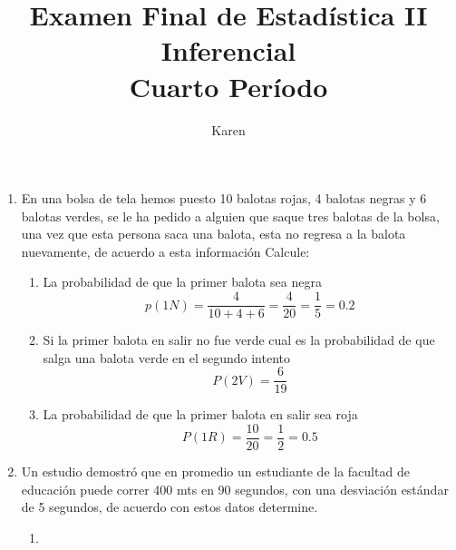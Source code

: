 \documentclass[10pt,a4paper]{article}
\author{Karen}
\title{Examen Final de Estadística II Inferencial\\
Cuarto Período}
\begin{document}
\maketitle
\begin{enumerate}
\item En una bolsa de tela hemos puesto 10 balotas rojas, 4 balotas negras y 6 balotas verdes, se le ha pedido a alguien que saque tres balotas de la bolsa, una vez que esta persona saca una balota, esta no regresa a la balota nuevamente, de acuerdo a esta información Calcule:
\begin{enumerate}
\item La probabilidad de que la primer balota sea negra
\[p(1N)=\dfrac{4}{10+4+6}=\dfrac{4}{20}=\dfrac{1}{5}=0.2\]
\item Si la primer balota en salir no fue verde cual es la probabilidad de que salga una balota verde en el segundo intento
\[P(2V)=\dfrac{6}{19}\]
\item La probabilidad de que la primer balota en salir sea roja
\[P(1R)=\dfrac{10}{20}=\dfrac{1}{2}=0.5\]
\end{enumerate}
\item Un estudio demostró que en promedio un estudiante de la facultad de educación puede correr 400 mts en 90 segundos, con una desviación estándar de 5 segundos, de acuerdo con estos datos determine.
\begin{enumerate}
\item 
\end{enumerate}
\end{enumerate}
\end{document}
